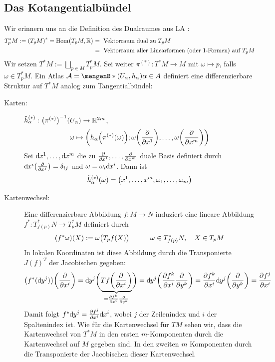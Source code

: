 \subsection{Das Kotangentialbündel} %
\label{sub:42}
Wir erinnern uns an die Definition des Dualraumes aus LA :
\begin{align*}
	T_p^* M := \enbrace*{T_pM}^* = \Hom\enbrace[\big]{T_pM, \mathds{R}} &= \text{ Vektorraum dual zu } T_p M  \\
	&= \text{ Vektorraum aller Linearformen (oder 1-Formen) auf } T_pM
\end{align*}
Wir setzen $T^*M := \bigsqcup_{p \in M} T_p^* M$. Sei weiter $\pi^{(*)} : T^*M \to M$ mit $\omega \mapsto p$, falls $\omega \in T_p^* M$. Ein Atlas 
$\mathcal{A} = \set[(U_\alpha, h_\alpha)]{\alpha \in A}$ definiert eine differenzierbare Struktur auf $T^*M$ analog zum Tangentialbündel:
\begin{description}
	\item[Karten:] $\tilde{h}^{(*)}_\alpha : \enbrace*{\pi^{(*)}} ^{-1} (U_\alpha) \to \mathds{R}^{2m}$, 
	\[
		\omega \mapsto \enbrace*{h_\alpha \enbrace*{\pi^{(*)}(\omega)}; \omega \enbrace*{\diff{}{x^1}}, \ldots , \omega \enbrace*{\diff{}{x^m} }   } 
	\]
	Sei $\mathd x^1, \ldots , \mathd x^m$ die zu $\diff{}{x^1}, \ldots , \diff{}{x^m}$ duale Basis definiert durch 
	$\mathd x^i \enbrace*{\diff{}{x^j} } = \delta_{ij} $ und $\omega= \omega_i \mathd x^i$. Dann ist
	\[
		\tilde{h}_\alpha^{(*)} (\omega) = \enbrace*{x^1, \ldots, x^m, \omega_1, \ldots , \omega_m} 
	\]
	\item[Kartenwechsel:] Eine differenzierbare Abbildung $f : M \to N$ induziert eine lineare Abbildung $f^* : T^*_{f(p)}N \to T^*_pM$ definiert durch 
	\[
		(f^* \omega)(X) := \omega \enbrace[\big]{T_p f(X)} \qquad  \quad \omega \in T_{f(p)}^*N, \quad X \in T_pM
	\]
	In lokalen Koordinaten ist diese Abbildung durch die Transponierte $J(f)^T$ der Jacobischen gegeben:
	\begin{align*}
		\enbrace*{f^*(\mathd y^j)} \enbrace*{\diff{}{x^i} } = \mathd y^j \enbrace[\bigg]{\underbrace{T f \enbrace*{\diff{}{x^i} }}_{= \diff{f^k}{x^i} \diff{}{y^k}} } 
		= \mathd y^j \enbrace*{\diff{f^k}{x^i} \diff{}{y^k}} = \diff{f^k}{x^i} \mathd y^j \enbrace*{\diff{}{y^k} } = \diff{f^j}{x^i}    
	\end{align*}
	Damit folgt $f^* \mathd y^j = \diff{f^j}{x^i} \mathd  x^i $, wobei $j$ der Zeilenindex und $i$ der Spaltenindex ist. Wie für die Kartenwechsel für $TM$ sehen wir,
	dass die Kartenwechsel von $T^*M$ in den ersten $m$-Komponenten durch die Kartenwechsel auf $M$ gegeben sind. In den zweiten $m$ Komponenten durch die Transponierte 
	der Jacobischen dieser Kartenwechsel. 
\end{description}

